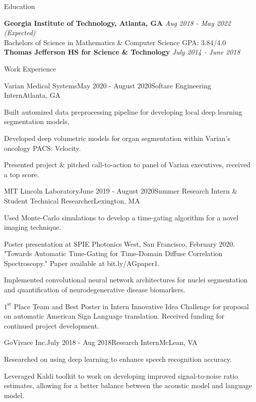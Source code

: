\documentclass{template} %
\begin{document}

\begin{rSection}{Education}

{\bf Georgia Institute of Technology, Atlanta, GA} \hfill {\em Aug 2018 - May 2022 (Expected)}
\\ Bachelors of Science in Mathematics \& Computer Science \hfill  GPA: 3.84/4.0 \medskip
\\ {\bf Thomas Jefferson HS for Science \& Technology} \hfill {\em July 2014 - June 2018}
\end{rSection}


\begin{rSection}{Work Experience}

\begin{rSubsection}{Varian Medical Systems}{May 2020 - August 2020}{Softare Engineering Intern}{Atlanta, GA}
\item Built automized data preprocessing pipeline for developing local deep learning segmentation models,
\item Developed deep volumetric models for organ segmentation within Varian's oncology PACS: Velocity.
\item Presented project \& pitched call-to-action to panel of Varian executives, received a top score.
\end{rSubsection}

\begin{rSubsection}{MIT Lincoln Laboratory}{June 2019 - August 2020}{Summer Research Intern \& Student Technical Researcher}{Lexington, MA}
\item Used Monte-Carlo simulations to develop a time-gating algorithm for a novel imaging technique.
\item Poster presentation at SPIE Photonics West, San Francisco, February 2020. "Towards Automatic Time-Gating for Time-Domain Diffuse Correlation Spectroscopy." Paper available at bit.ly/AGpaper1.
\item Implemented convolutional neural network architectures for nuclei segmentation and quantification of neurodegenerative disease biomarkers.
\item$1^{\text{st}}$ Place Team and Best Poster in Intern Innovative Idea Challenge for proposal on automatic American Sign Language translation. Received funding for continued project development.
\end{rSubsection}

\begin{rSubsection}{GoVivace Inc.}{July 2018 - Aug 2018}{Research Intern}{McLean, VA}
\item Researched on using deep learning to enhance speech recognition accuracy.
\item Leveraged Kaldi toolkit to work on developing improved signal-to-noise ratio estimates, allowing for a better balance between the acoustic model and language model.
\end{rSubsection}


\end{rSection}
\end{document}

